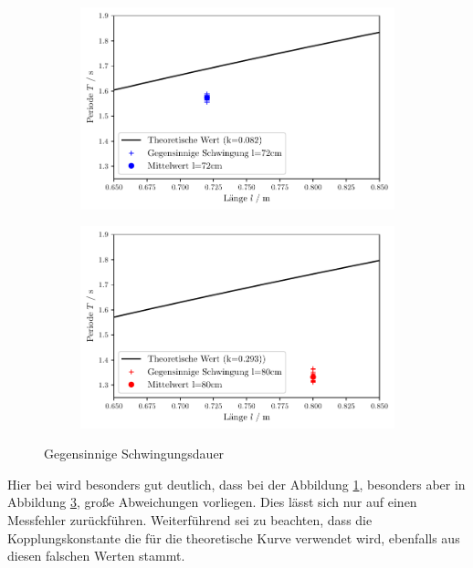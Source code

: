 \begin{figure}
    \begin{subfigure}[c]{0.5\textwidth}
        \includegraphics[width=\textwidth]{plots/plot2.pdf}
        \label{fig:pendel72}
    \end{subfigure}
    \begin{subfigure}[c]{0.5\textwidth}
        \includegraphics[width=\textwidth]{plots/plot3.pdf}
        \label{fig:pendel80}
    \end{subfigure}
    \caption{Gegensinnige Schwingungsdauer}
\end{figure}

Hier bei wird besonders gut deutlich, dass bei der Abbildung \ref{fig:pendel72}, besonders aber in Abbildung \ref{fig:pendel80}, große Abweichungen
vorliegen. Dies lässt sich nur auf einen Messfehler zurückführen.
Weiterführend sei zu beachten, dass die Kopplungskonstante die für die theoretische Kurve
verwendet wird, ebenfalls aus diesen falschen Werten stammt.

